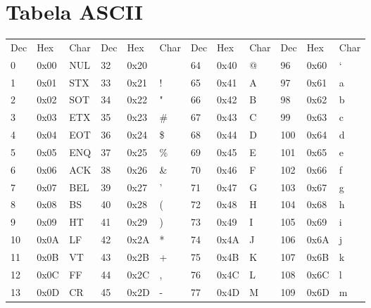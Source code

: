 \documentclass{book}
\begin{document}




\appendix
\chapter{Tabela ASCII}

{\tt\small

\begin{tabular}{|lll|lll|lll|lll|}

  Dec &   Hex & Char &  Dec &   Hex & Char &  Dec &   Hex & Char &  Dec &   Hex & Char \\

    0 &  0x00 &  NUL &   32 &  0x20 &      &   64 &  0x40 &    @ &   96 &  0x60 &    ` \\
    1 &  0x01 &  STX &   33 &  0x21 &    ! &   65 &  0x41 &    A &   97 &  0x61 &    a \\
    2 &  0x02 &  SOT &   34 &  0x22 &    " &   66 &  0x42 &    B &   98 &  0x62 &    b \\
    3 &  0x03 &  ETX &   35 &  0x23 &   \# &   67 &  0x43 &    C &   99 &  0x63 &    c \\
    4 &  0x04 &  EOT &   36 &  0x24 &   \$ &   68 &  0x44 &    D &  100 &  0x64 &    d \\
    5 &  0x05 &  ENQ &   37 &  0x25 &   \% &   69 &  0x45 &    E &  101 &  0x65 &    e \\
    6 &  0x06 &  ACK &   38 &  0x26 &   \& &   70 &  0x46 &    F &  102 &  0x66 &    f \\
    7 &  0x07 &  BEL &   39 &  0x27 &    ' &   71 &  0x47 &    G &  103 &  0x67 &    g \\
    8 &  0x08 &   BS &   40 &  0x28 &    ( &   72 &  0x48 &    H &  104 &  0x68 &    h \\
    9 &  0x09 &   HT &   41 &  0x29 &    ) &   73 &  0x49 &    I &  105 &  0x69 &    i \\
   10 &  0x0A &   LF &   42 &  0x2A &    * &   74 &  0x4A &    J &  106 &  0x6A &    j \\
   11 &  0x0B &   VT &   43 &  0x2B &    + &   75 &  0x4B &    K &  107 &  0x6B &    k \\
   12 &  0x0C &   FF &   44 &  0x2C &    , &   76 &  0x4C &    L &  108 &  0x6C &    l \\
   13 &  0x0D &   CR &   45 &  0x2D &    - &   77 &  0x4D &    M &  109 &  0x6D &    m \\

\end{tabular}}
\end{document}
